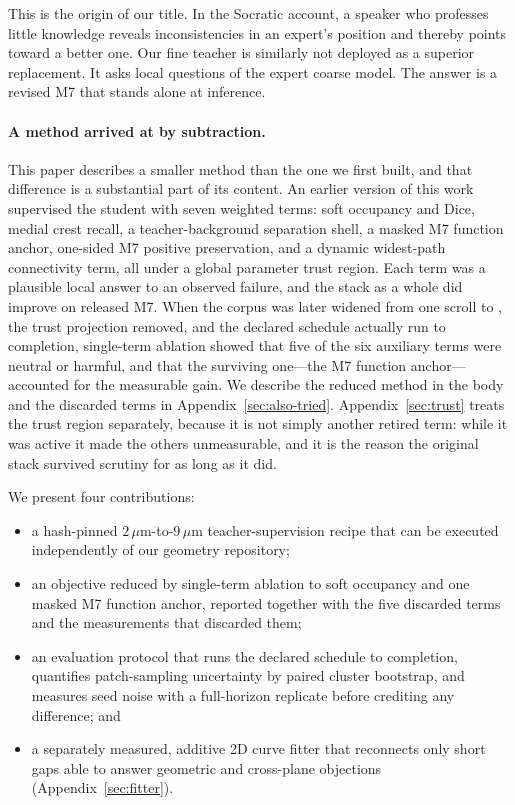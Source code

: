 This is the origin of our title.
In the Socratic account, a speaker who professes little knowledge reveals
inconsistencies in an expert's position and thereby points toward a better one.
Our fine teacher is similarly not deployed as a superior replacement.
It asks local questions of the expert coarse model.
The answer is a revised M7 that stands alone at inference.

\paragraph{A method arrived at by subtraction.}
This paper describes a smaller method than the one we first built, and that
difference is a substantial part of its content.
An earlier version of this work supervised the student with seven weighted
terms: soft occupancy and Dice, medial crest recall, a teacher-background
separation shell, a masked M7 function anchor, one-sided M7 positive
preservation, and a dynamic widest-path connectivity term, all under a global
parameter trust region.
Each term was a plausible local answer to an observed failure, and the stack as
a whole did improve on released M7.
When the corpus was later widened from one scroll to \corpusScrolls, the trust
projection removed, and the declared schedule actually run to completion,
single-term ablation showed that five of the six auxiliary terms were neutral or
harmful, and that the surviving one---the M7 function anchor---accounted for the
measurable gain.
We describe the reduced method in the body and the discarded terms in
Appendix~\ref{sec:also-tried}.
Appendix~\ref{sec:trust} treats the trust region separately, because it is not
simply another retired term: while it was active it made the others
unmeasurable, and it is the reason the original stack survived scrutiny for as
long as it did.

We present four contributions:
\begin{itemize}
  \item a hash-pinned $2\,\mu$m-to-$9\,\mu$m teacher-supervision recipe that
  can be executed independently of our geometry repository;
  \item an objective reduced by single-term ablation to soft occupancy and one
  masked M7 function anchor, reported together with the five discarded terms
  and the measurements that discarded them;
  \item an evaluation protocol that runs the declared schedule to completion,
  quantifies patch-sampling uncertainty by paired cluster bootstrap, and
  measures seed noise with a full-horizon replicate before crediting any
  difference; and
  \item a separately measured, additive 2D curve fitter that reconnects only
  short gaps able to answer geometric and cross-plane objections
  (Appendix~\ref{sec:fitter}).
\end{itemize}

